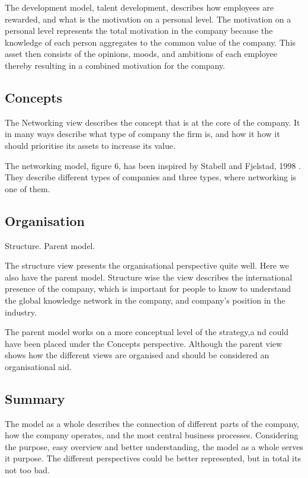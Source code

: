 \documentclass[12pt, a4paper]{article}
\begin{document}
The development model, talent development, describes how employees are
rewarded, and what is the motivation on a personal level. The motivation on a
personal level represents the total motivation in the company because the
knowledge of each person aggregates to the common value of the company. This
asset then consists of the opinions, moods, and ambitions of each employee
thereby resulting in a combined motivation for the company. 
 
\subsection{Concepts}
The Networking view describes the concept that is at the core of the company.
It in many ways describe what type of company the firm is, and how it how it
should prioritise its assets to increase its value. 

The networking model, figure 6, has been inspired by
Stabell and Fjelstad, 1998 \cite{StabellFjeldstad1998}. They describe different
types of companies and three types, where networking is one of them.

\subsection{Organisation}
Structure. Parent model. 

The structure view presents the organisational perspective quite well. Here we
also have the parent model. Structure wise the view describes the international
presence of the company, which is important for people to know to understand
the global knowledge network in the company, and company's position in the
industry. 

The parent model works on a more conceptual level of the strategy,a
nd could have been placed under the Concepts perspective. Although the parent
view shows how the different views are organised and should be considered an
organisational aid. 

\subsection{Summary}
The model as a whole describes the connection of different parts of the
company, how the company operates, and the most central business processes.
Considering the purpose, easy overview and better understanding, the model as a
whole serves it purpose. The different perspectives could be better
represented, but in total its not too bad.    
\end{document}
